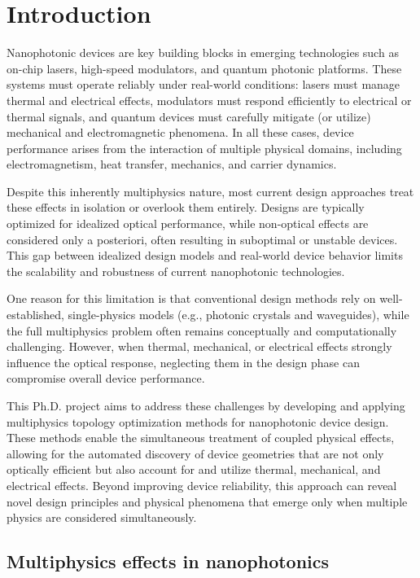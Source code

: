\chapter{Introduction}
Nanophotonic devices are key building blocks in emerging technologies such as on-chip lasers, high-speed modulators, and quantum photonic platforms. 
These systems must operate reliably under real-world conditions: lasers must manage thermal and electrical effects, modulators must respond efficiently 
to electrical or thermal signals, and quantum devices must carefully mitigate (or utilize) mechanical and electromagnetic phenomena. In all these cases, device 
performance arises from the interaction of multiple physical domains, including electromagnetism, heat transfer, mechanics, and carrier dynamics.

Despite this inherently multiphysics nature, most current design approaches treat these effects in isolation or overlook them entirely. Designs are typically optimized 
for idealized optical performance, while non-optical effects are considered only a posteriori,
often resulting in suboptimal or unstable devices. This gap between idealized design models and real-world device behavior limits the scalability and robustness of current nanophotonic technologies.

One reason for this limitation is that conventional design methods rely on well-established, single-physics models (e.g., photonic crystals and waveguides), while the full multiphysics problem often remains conceptually and computationally challenging.
However, when thermal, mechanical, or electrical effects strongly influence the optical response, neglecting them in the design phase can compromise overall device performance.

This Ph.D. project aims to address these challenges by developing and applying multiphysics topology optimization methods for nanophotonic device design. These methods enable the simultaneous treatment of coupled physical effects, 
allowing for the automated discovery of device geometries that are not only optically efficient but also account for and utilize thermal, mechanical, and electrical effects. Beyond improving device reliability, this approach can reveal 
novel design principles and physical phenomena that emerge only when multiple physics are considered simultaneously.

\section{Multiphysics effects in nanophotonics}\label{intro:multi}

